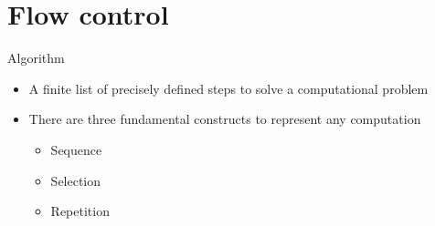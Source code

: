 

\section*{Flow control}

\begin{frame}{Algorithm}

  \begin{itemize}
  \item A finite list of precisely defined steps to solve a computational
    problem
  \item There are three fundamental constructs to represent any computation
    \begin{itemize}
    \item Sequence
    \item Selection
    \item Repetition
    \end{itemize}
  \end{itemize}

\end{frame}

